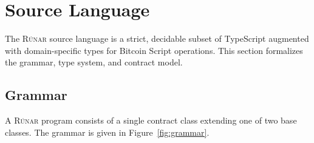 \documentclass[11pt,a4paper]{article}
\newcommand{\runar}{\textsc{Rúnar}}
\begin{document}
\section{Source Language}
\label{sec:language}

The \runar{} source language is a strict, decidable subset of TypeScript
augmented with domain-specific types for Bitcoin Script operations. This
section formalizes the grammar, type system, and contract model.

\subsection{Grammar}
\label{sec:grammar}

A \runar{} program consists of a single contract class extending one of two
base classes. The grammar is given in Figure~\ref{fig:grammar}.
\end{document}
